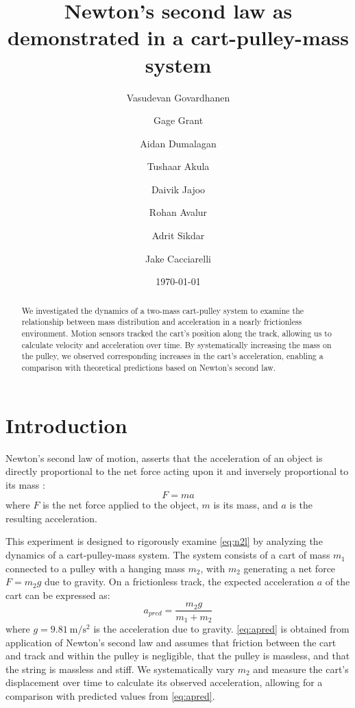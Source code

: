 ﻿\documentclass[reprint,amsmath,amssymb,aps]{revtex4-2}
\begin{document}
\title{Newton's second law as demonstrated in a cart-pulley-mass system}

\author{Vasudevan Govardhanen}
\author{Gage Grant}
\author{Aidan Dumalagan}
\author{Tushaar Akula}
\author{Daivik Jajoo}
\author{Rohan Avalur}
\author{Adrit Sikdar}
\author{Jake Cacciarelli}
\date{\today}

\begin{abstract}
We investigated the dynamics of a two-mass cart-pulley system to examine the relationship between mass distribution and acceleration in a nearly frictionless environment. Motion sensors tracked the cart’s position along the track, allowing us to calculate velocity and acceleration over time. By systematically increasing the mass on the pulley, we observed corresponding increases in the cart's acceleration, enabling a comparison with theoretical predictions based on Newton’s second law.
\end{abstract}


\maketitle






\section{Introduction}
Newton's second law of motion, asserts that the acceleration of an object is directly proportional to the net force acting upon it and inversely proportional to its mass \cite{tipler}:
\begin{equation}
F = ma
\label{eq:n2l}
\end{equation}
where $F$ is the net force applied to the object, $m$ is its mass, and $a$ is the resulting acceleration.

This experiment is designed to rigorously examine \cref{eq:n2l} by analyzing the dynamics of a cart-pulley-mass system. The system consists of a cart of mass $m_1$ connected to a pulley with a hanging mass $m_2$, with $m_2$ generating a net force $F = m_2 g$ due to gravity. On a frictionless track, the expected acceleration $a$ of the cart can be expressed as:
\begin{equation}
a_{pred} = \frac{m_2 g}{m_1 + m_2}
\label{eq:apred}
\end{equation}
where $g=\qty{9.81}{\meter\per\second\squared}$ is the acceleration due to gravity. \cref{eq:apred} is obtained from application of Newton's second law and assumes that friction between the cart and track and within the pulley is negligible, that the pulley is massless, and that the string is massless and stiff. We systematically vary $m_2$ and measure the cart's displacement over time to calculate its observed acceleration, allowing for a comparison with predicted values from \cref{eq:apred}.
\end{document}
